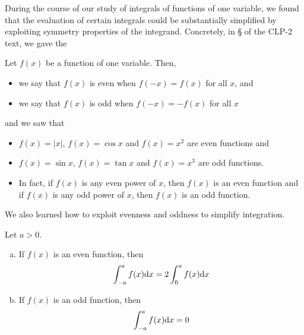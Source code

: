 During the course of our study of integrals of functions of one variable,
we found that the evaluation of certain integrals could be substantially simplified by exploiting symmetry properties of the integrand. Concretely,
in \S{} of the CLP-2 text, we gave the
\begin{defn}\label{def_evenodd_one_variable}
  Let $f(x)$ be a function of one variable. Then,
 \begin{itemize}
  \item we say that $f(x)$ is even when $f(-x)=f(x)$ for all $x$, and
  \item we say that $f(x)$ is odd when $f(-x)=-f(x)$ for all $x$
 \end{itemize}
\end{defn}
and we saw that 
\begin{itemize}
\item 
$f(x)=|x|$, $f(x)=\cos x$ and $f(x)=x^2$ are even functions and
\item
$f(x)=\sin x$, $f(x)=\tan x$ and  $f(x)=x^3$ are odd functions.
\item
In fact, if $f(x)$ is any even power of $x$, then $f(x)$ is an
even function and if $f(x)$ is any odd power of $x$, then $f(x)$ is
         an odd function.
\end{itemize}
We also learned how to exploit evenness and oddness to simplify integration.
\begin{theorem}
\label{thm:INTevenodd}
Let $a>0$.
\begin{enumerate}[(a)]
\item If $f(x)$ is an even function, then
\begin{align*}
\int_{-a}^a f(x) \mathrm{d}x = 2\int_0^a f(x) \mathrm{d}x
\end{align*}
\item If $f(x)$ is an odd function, then
\begin{align*}
\int_{-a}^a f(x) \mathrm{d}x = 0
\end{align*}
\end{enumerate}
\end{theorem}

